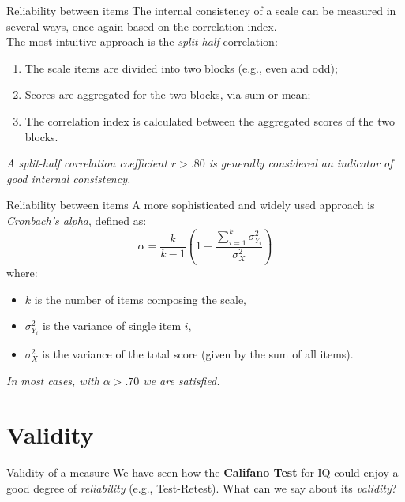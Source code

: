 \documentclass{beamer}
\begin{document}
\begin{frame}{Reliability between items}
    The internal consistency of a scale can be measured in several ways, once again based on the correlation index. \\
    \vspace{1em}
    The most intuitive approach is the \textit{split-half} correlation:
    \begin{enumerate}
        \item The scale items are divided into two blocks (e.g., even and odd);
        \item Scores are aggregated for the two blocks, via sum or mean;
        \item The correlation index is calculated between the aggregated scores of the two blocks.
    \end{enumerate}
    \centering
    \vspace{1em}
    \textit{A split-half correlation coefficient $r > .80$ is generally considered an indicator of good internal consistency.}
\end{frame}

\begin{frame}{Reliability between items}
A more sophisticated and widely used approach is \textit{Cronbach's alpha}, defined as:
\[
\alpha = \frac{k}{k - 1} \left(1 - \frac{\sum_{i=1}^{k} \sigma^2_{Y_i}}{\sigma^2_X}\right)
\]
where:
\begin{itemize}
    \item \(k\) is the number of items composing the scale,
    \item \(\sigma^2_{Y_i}\) is the variance of single item \(i\),
    \item \(\sigma^2_X\) is the variance of the total score (given by the sum of all items).
\end{itemize}
\vspace{1em}
\centering
\textit{In most cases, with \(\alpha > .70\) we are satisfied.}
\end{frame}

\section{Validity}
\begin{frame}{Validity of a measure}
    We have seen how the \textbf{Califano Test} for IQ could enjoy a good degree of \textit{reliability} (e.g., Test-Retest). What can we say about its \textit{validity}?
\end{frame}
\end{document}
